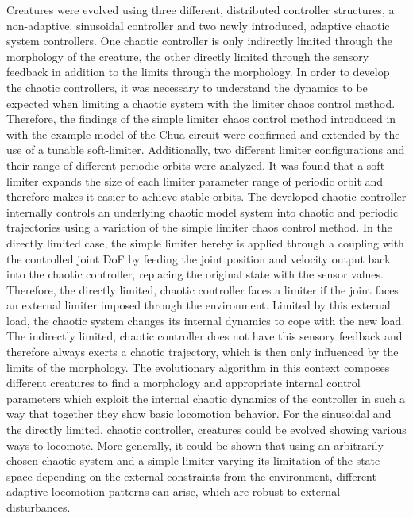 \documentclass[main]{subfiles}
\begin{document}
Creatures were evolved using three different, distributed controller structures, a non-adaptive, sinusoidal controller and two newly introduced, adaptive chaotic system controllers. %
%
One chaotic controller is only indirectly limited through the morphology of the creature, the other directly limited through the sensory feedback in addition to the limits through the morphology. %
%
In order to develop the chaotic controllers, it was necessary to understand the dynamics to be expected when limiting a chaotic system with the limiter chaos control method. %
%
Therefore, the findings of the simple limiter chaos control method introduced in \cite{bib:Corron2000} with the example model of the Chua circuit \cite{bib:Matsumoto1985} were confirmed and extended by the use of a tunable soft-limiter. %
%
Additionally, two different limiter configurations and their range of different periodic orbits were analyzed. %
%
It was found that a soft-limiter expands the size of each limiter parameter range of periodic orbit and therefore makes it easier to achieve stable orbits. %
%
The developed chaotic controller internally controls an underlying chaotic model system into chaotic and periodic trajectories using a variation of the simple limiter chaos control method. %
%
In the directly limited case, the simple limiter hereby is applied through a coupling with the controlled joint DoF by feeding the joint position and velocity output back into the chaotic controller, replacing the original state with the sensor values. %
%
Therefore, the directly limited, chaotic controller faces a limiter if the joint faces an external limiter imposed through the environment. %
%
Limited by this external load, the chaotic system changes its internal dynamics to cope with the new load. %
%
The indirectly limited, chaotic controller does not have this sensory feedback and therefore always exerts a chaotic trajectory, which is then only influenced by the limits of the morphology.%
%
The evolutionary algorithm in this context composes different creatures to find a morphology and appropriate internal control parameters which exploit the internal chaotic dynamics of the controller in such a way that together they show basic locomotion behavior. %
%
For the sinusoidal and the directly limited, chaotic controller, creatures could be evolved showing various ways to locomote. %
%
More generally, it could be shown that using an arbitrarily chosen chaotic system and a simple limiter varying its limitation of the state space depending on the external constraints from the environment, different adaptive locomotion patterns can arise, which are robust to external disturbances. %
\end{document}
